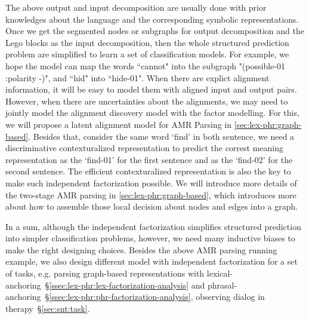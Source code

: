 { The above output and input decomposition
are usually done with prior knowledges about the language and the
corresponding symbolic representations. Once we get the segmented
nodes or subgraphs for output decomposition and the Lego blocks as the
input decomposition, then the whole structured prediction problem are
simplified to learn a set of classification models. For example, we
hope the model can map the words ``cannot" into the subgraph
"(possible-01 :polarity -)", and ``hid" into ``hide-01". When there
are explict alignment information, it will be easy to model them with
aligned input and output pairs. However, when there are uncertainties
about the alignments, we may need to jointly model the alignment
discovery model with the factor modelling. For this, we will propose a
latent alignment model for AMR Parsing in
\autoref{sec:lex-phr:graph-based}. Besides that, consider the same
word `find' in both sentence, we need a discriminative contexturalized
representation to predict the correst meaning representation as the
`find-01' for the first sentence and as the `find-02' for the second
sentence. The efficient contexturalized representation is also the key
to make such independent factorization possible. We will introduce
more details of the two-stage AMR parsing in
\autoref{sec:lex-phr:graph-based}, which introduces more about how to
assemble those local decision about nodes and edges into a graph.

In a sum, although the independent factorization simplifies structured
prediction into simpler classification problems, however, we need many
inductive biases to make the right designing choices. Besides the
above AMR parsing running example, we also design different model with
independent factorization for a set of tasks, e.g. parsing graph-based
representations with
lexical-anchoring~\S\ref{ssec:lex-phr:lex-factorization-analysis} and
phrasal-anchoring~\S\ref{ssec:lex-phr:phr-factorization-analysis},
observing dialog in therapy~\S\ref{sec:snt:task}.


}
